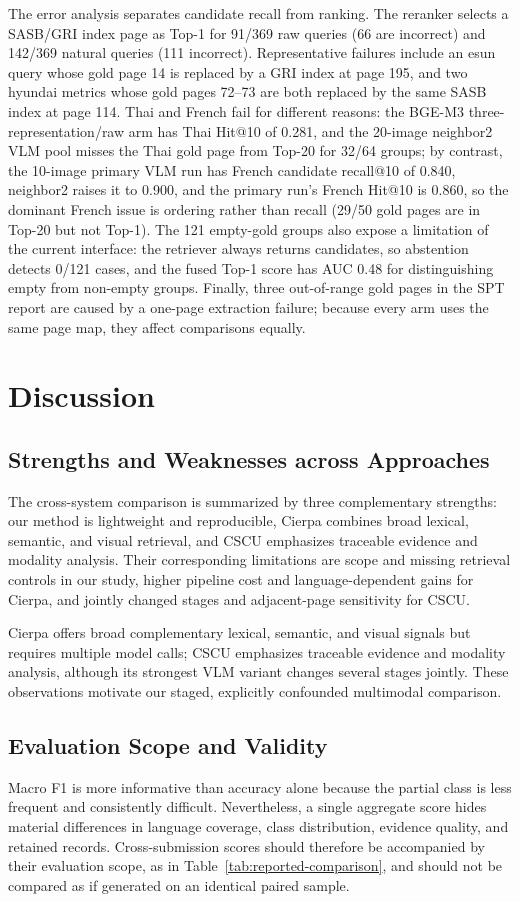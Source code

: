 \documentclass[sigconf,article]{acmart}
\begin{document}
The error analysis separates candidate recall from ranking. The reranker selects a SASB/GRI index page as Top-1 for 91/369 raw queries (66 are incorrect) and 142/369 natural queries (111 incorrect). Representative failures include an esun query whose gold page 14 is replaced by a GRI index at page 195, and two hyundai metrics whose gold pages 72--73 are both replaced by the same SASB index at page 114. Thai and French fail for different reasons: the BGE-M3 three-representation/raw arm has Thai Hit@10 of 0.281, and the 20-image neighbor2 VLM pool misses the Thai gold page from Top-20 for 32/64 groups; by contrast, the 10-image primary VLM run has French candidate recall@10 of 0.840, neighbor2 raises it to 0.900, and the primary run's French Hit@10 is 0.860, so the dominant French issue is ordering rather than recall (29/50 gold pages are in Top-20 but not Top-1). The 121 empty-gold groups also expose a limitation of the current interface: the retriever always returns candidates, so abstention detects 0/121 cases, and the fused Top-1 score has AUC 0.48 for distinguishing empty from non-empty groups. Finally, three out-of-range gold pages in the SPT report are caused by a one-page extraction failure; because every arm uses the same page map, they affect comparisons equally.

\section{Discussion}
\subsection{Strengths and Weaknesses across Approaches}
The cross-system comparison is summarized by three complementary strengths: our method is lightweight and reproducible, Cierpa combines broad lexical, semantic, and visual retrieval, and CSCU emphasizes traceable evidence and modality analysis. Their corresponding limitations are scope and missing retrieval controls in our study, higher pipeline cost and language-dependent gains for Cierpa, and jointly changed stages and adjacent-page sensitivity for CSCU.

Cierpa offers broad complementary lexical, semantic, and visual signals but requires multiple model calls; CSCU emphasizes traceable evidence and modality analysis, although its strongest VLM variant changes several stages jointly. These observations motivate our staged, explicitly confounded multimodal comparison.

\subsection{Evaluation Scope and Validity}
Macro F1 is more informative than accuracy alone because the partial class is less frequent and consistently difficult. Nevertheless, a single aggregate score hides material differences in language coverage, class distribution, evidence quality, and retained records. Cross-submission scores should therefore be accompanied by their evaluation scope, as in Table~\ref{tab:reported-comparison}, and should not be compared as if generated on an identical paired sample.
\end{document}
